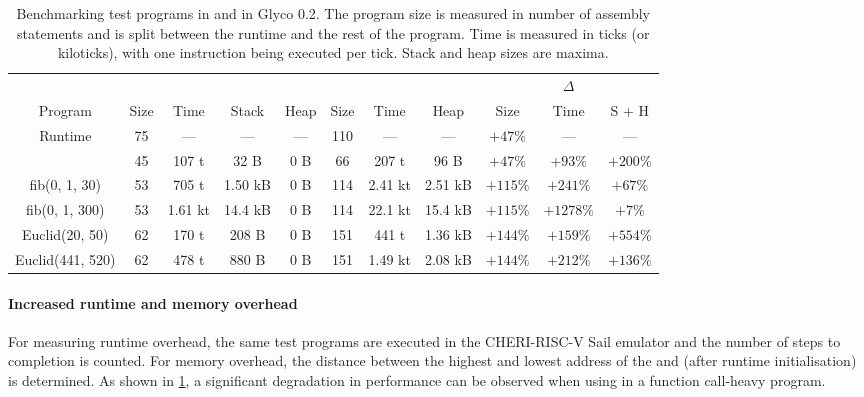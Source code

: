 \documentclass[main.tex]{subfiles}
\begin{document}
\begin{table}[h]
	\medskip	%
	\begin{adjustwidth}{-1in}{-1in}
		\centering
		\footnotesize
		\begin{tabular}{ccccccccccc}
			\toprule
								& \multicolumn{4}{c}{\g{gccc}}			& \multicolumn{3}{c}{\g{ghscc}}		& \multicolumn{3}{c}{$\Delta$}		\\
								\cmidrule(lr){2-5}						\cmidrule(lr){6-8}					\cmidrule(lr){9-11}
			Program				& Size	& Time		& Stack		& Heap	& Size	& Time		& Heap		& Size		& Time		& S + H		\\
			\midrule
			Runtime				& 75	& —			& —			& —		& 110	& —			& —			& $+47\%$	& —			& —			\\
			\addlinespace
			42					& 45	& 107 t		& 32 B		& 0 B	& 66	& 207 t		& 96 B		& $+47\%$	& $+93\%$	& $+200\%$	\\
			fib(0, 1, 30)		& 53	& 705 t		& 1.50 kB	& 0 B	& 114	& 2.41 kt	& 2.51 kB	& $+115\%$	& $+241\%$	& $+67\%$	\\
			fib(0, 1, 300)		& 53	& 1.61 kt	& 14.4 kB	& 0 B	& 114	& 22.1 kt	& 15.4 kB	& $+115\%$	& $+1278\%$	& $+7\%$	\\
			Euclid(20, 50)		& 62	& 170 t		& 208 B		& 0 B	& 151	& 441 t		& 1.36 kB	& $+144\%$	& $+159\%$	& $+554\%$	\\
			Euclid(441, 520)	& 62	& 478 t		& 880 B		& 0 B	& 151	& 1.49 kt	& 2.08 kB	& $+144\%$	& $+212\%$	& $+136\%$	\\
			\bottomrule
		\end{tabular}
	\end{adjustwidth}
	\caption{Benchmarking test programs in  and  in Glyco 0.2. The program size is measured in number of assembly statements and is split between the runtime and the rest of the program. Time is measured in ticks (or kiloticks), with one instruction being executed per tick. Stack and heap sizes are maxima.}
	\label{tbl:ghscc-size}
\end{table}

\paragraph{Increased runtime and memory overhead} For measuring runtime overhead, the same test programs are executed in the CHERI-RISC-V Sail emulator and the number of steps to completion is counted. For memory overhead, the distance between the highest and lowest address of the  and  (after runtime initialisation) is determined. As shown in \cref{tbl:ghscc-size}, a significant degradation in performance can be observed when using  in a function call-heavy program.
\end{document}
